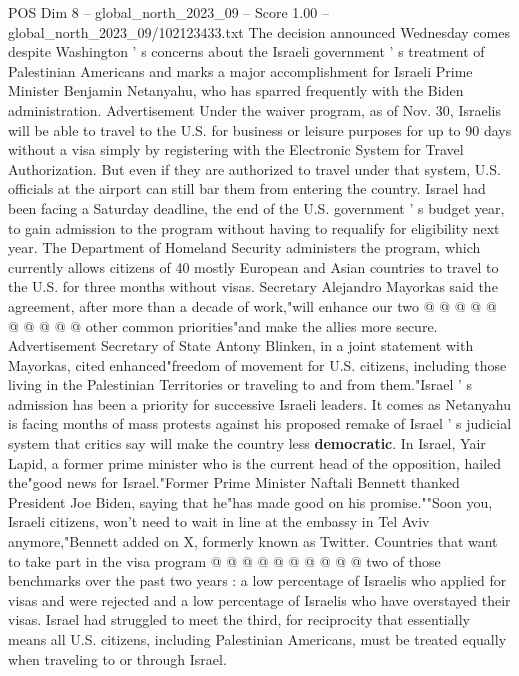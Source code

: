 \begin{textsample}{POS Dim 8 – global\_north\_2023\_09 – Score 1.00 – global\_north\_2023\_09/102123433.txt}  \label{ex:f8_pos_304}
The decision announced Wednesday comes despite Washington ' s concerns about the Israeli government ' s treatment of Palestinian Americans and marks a major accomplishment for Israeli Prime Minister Benjamin Netanyahu, who has sparred frequently with the Biden administration.
Advertisement Under the waiver program, as of Nov. 30, Israelis will be able to travel to the U.S. for business or leisure purposes for up to 90 days without a visa simply by registering with the Electronic System for Travel Authorization.
But even if they are authorized to travel under that system, U.S. officials at the airport can still bar them from entering the country.
Israel had been facing a Saturday deadline, the end of the U.S. government ' s budget year, to gain admission to the program without having to requalify for eligibility next year.
The Department of Homeland Security administers the program, which currently allows citizens of 40 mostly European and Asian countries to travel to the U.S. for three months without visas.
Secretary Alejandro Mayorkas said the agreement, after more than a decade of work,"will enhance our two @ @ @ @ @ @ @ @ @ @ other common priorities"and make the allies more secure.
Advertisement Secretary of State Antony Blinken, in a joint statement with Mayorkas, cited enhanced"freedom of movement for U.S. citizens, including those living in the Palestinian Territories or traveling to and from them."Israel ' s admission has been a priority for successive Israeli leaders.
It comes as Netanyahu is facing months of mass protests against his proposed remake of Israel ' s judicial system that critics say will make the country less \textbf{democratic}.
In Israel, Yair Lapid, a former prime minister who is the current head of the opposition, hailed the"good news for Israel."Former Prime Minister Naftali Bennett thanked President Joe Biden, saying that he"has made good on his promise.""Soon you, Israeli citizens, won't need to wait in line at the embassy in Tel Aviv anymore,"Bennett added on X, formerly known as Twitter.
Countries that want to take part in the visa program @ @ @ @ @ @ @ @ @ @ two of those benchmarks over the past two years : a low percentage of Israelis who applied for visas and were rejected and a low percentage of Israelis who have overstayed their visas.
Israel had struggled to meet the third, for reciprocity that essentially means all U.S. citizens, including Palestinian Americans, must be treated equally when traveling to or through Israel.

\end{textsample}
